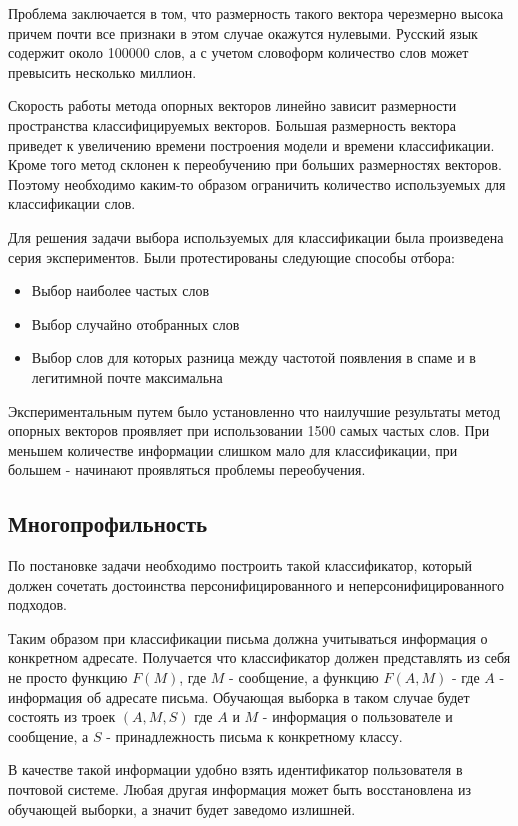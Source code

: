 Проблема заключается в том, что размерность такого вектора черезмерно высока причем
почти все признаки в этом случае окажутся нулевыми. Русский язык содержит около 100000 слов, а с
учетом словоформ количество слов может превысить несколько миллион.

Скорость работы метода опорных векторов линейно зависит размерности пространства классифицируемых векторов.
Большая размерность вектора приведет к увеличению времени построения модели и времени классификации.
Кроме того метод склонен к переобучению при больших размерностях векторов. Поэтому необходимо каким-то образом ограничить количество используемых для классификации слов.

Для решения задачи выбора используемых для классификации была произведена серия экспериментов.
Были протестированы следующие способы отбора:
\begin{itemize}
\item Выбор наиболее частых слов
\item Выбор случайно отобранных слов
\item Выбор слов для которых разница между частотой появления в спаме и в легитимной почте максимальна
\end{itemize}

Экспериментальным путем было установленно что наилучшие результаты метод опорных векторов проявляет при использовании 1500 самых частых слов. При меньшем количестве информации слишком мало для классификации, при большем - начинают проявляться проблемы переобучения.

\subsection{Многопрофильность}
По постановке задачи необходимо построить такой классификатор, который должен сочетать достоинства персонифицированного и неперсонифицированного подходов. 

Таким образом при классификации письма должна учитываться информация о конкретном адресате. Получается что классификатор должен представлять из себя не просто функцию $F(M)$, где $M$ - сообщение, а функцию $F(A, M)$ - где $A$ - информация об адресате письма. 
Обучающая выборка в таком случае будет состоять из троек $(A, M, S)$  где $A$ и $M$ - информация о пользователе и сообщение, а $S$ - принадлежность письма к конкретному классу.

В качестве такой информации удобно взять идентификатор пользователя в почтовой системе. Любая другая информация может быть восстановлена из обучающей выборки, а значит будет заведомо излишней.

